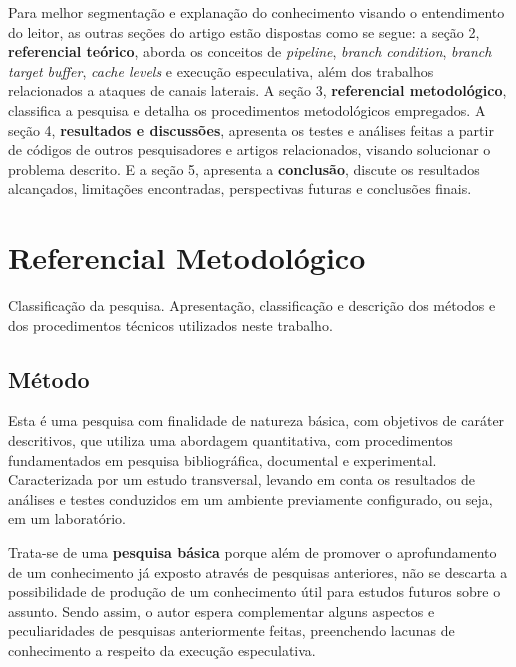 \documentclass[
	article,			    %
	12pt,				    %
	oneside,			    %
	a4paper,			    %
	chapter=TITLE,		    %
	section=TITLE,		    %
	subsection=TITLE,	    %
	english,			    %
	brazil,				    %
	sumario=tradicional
]{abntex2}
\begin{document}
Para melhor segmentação e explanação do conhecimento visando o entendimento do leitor, as outras seções do artigo estão dispostas como se segue: a seção 2, \textbf{referencial teórico}, aborda os conceitos de \emph{pipeline}, \emph{branch condition}, \emph{branch target buffer}, \emph{cache levels} e execução especulativa, além dos trabalhos relacionados a ataques de canais laterais. A seção 3, \textbf{referencial metodológico}, classifica a pesquisa e detalha os procedimentos metodológicos empregados. A seção 4, \textbf{resultados e discussões}, apresenta os testes e análises feitas a partir de códigos de outros pesquisadores e artigos relacionados, visando solucionar o problema descrito. E a seção 5, apresenta a \textbf{conclusão}, discute os resultados alcançados, limitações encontradas, perspectivas futuras e conclusões finais.

\section{Referencial Metodológico}
Classificação da pesquisa. Apresentação, classificação e descrição dos métodos e dos procedimentos técnicos utilizados neste trabalho.
\subsection{Método}
Esta é uma pesquisa com finalidade de natureza básica, com objetivos de caráter descritivos, que utiliza uma abordagem quantitativa, com procedimentos fundamentados em pesquisa bibliográfica, documental e experimental. Caracterizada por um estudo transversal, levando em conta os resultados de análises e testes conduzidos em um ambiente previamente configurado, ou seja, em um laboratório.

Trata-se de uma \textbf{pesquisa básica} porque além de promover o aprofundamento de um conhecimento já exposto através de pesquisas anteriores, não se descarta a possibilidade de produção de um conhecimento útil para estudos futuros sobre o assunto. Sendo assim, o autor espera complementar alguns aspectos e peculiaridades de pesquisas anteriormente feitas, preenchendo lacunas de conhecimento a respeito da execução especulativa.
\end{document}
